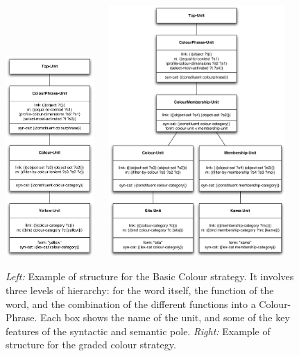 \begin{figure}[htbp]
  \centerline{\includegraphics[width=0.3\textwidth]{chap11/figs/syntactic-basic.pdf} $~~~~$ 
\includegraphics[width=0.6\textwidth]{chap11/figs/syntactic-graded.pdf}}
\caption{\label{fig:syntactic-graded} 
{\itshape Left:} Example of structure for the Basic Colour strategy. It involves three levels of hierarchy: for the word 
itself, the function of the word, and the combination of the different functions into a Colour-Phrase. Each box 
shows the name of the unit, and some of the key features of the syntactic and semantic pole.
{\itshape Right:} Example of structure for the graded colour strategy.}
\end{figure}

